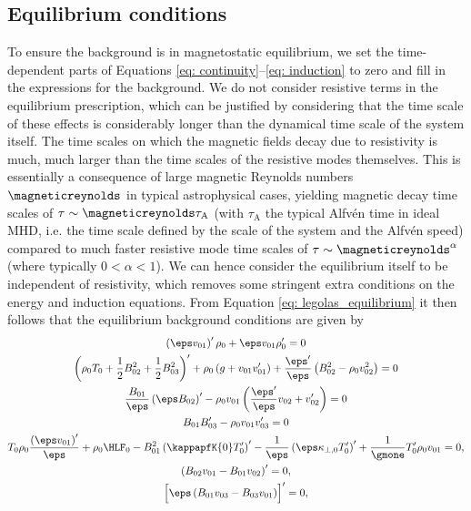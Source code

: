 \subsection{Equilibrium conditions} \label{ss: equilibrium conditions}
To ensure the background is in magnetostatic equilibrium, we set the time-dependent parts of Equations \eqref{eq: continuity}--\eqref{eq: induction} to zero and fill in the expressions for the background. We do not consider resistive terms in the equilibrium prescription, which can be justified by considering that the time scale of these effects is considerably longer than the dynamical time scale of the system itself. The time scales on which the magnetic fields decay due to resistivity is much, much larger than the time scales of the resistive modes themselves. This is essentially a consequence of large magnetic Reynolds numbers $\magneticreynolds$ in typical astrophysical cases, yielding magnetic decay time scales of $\tau \sim \magneticreynolds \tau_\text{A}$ (with $\tau_\text{A}$ the typical Alfv\'en time in ideal MHD, i.e. the time scale defined by the scale of the system and the Alfv\'en speed) compared to much faster resistive mode time scales of $\tau \sim \magneticreynolds^\alpha$ (where typically $0 < \alpha < 1$). We can hence consider the equilibrium itself to be independent of resistivity, which removes some stringent extra conditions on the energy and induction equations. From Equation \eqref{eq: legolas_equilibrium} it then follows that the equilibrium background conditions are given by
\begingroup
\allowdisplaybreaks
\begin{gather}
  \left(\eps v_{01}\right)'\rho_0 + \eps v_{01}\rho_0' = 0 \\
  \left(\rho_0 T_0 + \frac{1}{2}B_{02}^2 + \frac{1}{2}B_{03}^2\right)'
    + \rho_0\left(g + v_{01}v_{01}'\right)
    + \frac{\eps'}{\eps}\left(B_{02}^2
    - \rho_0 v_{02}^2\right) = 0 \\
  \frac{B_{01}}{\eps}\left(\eps B_{02}\right)' - \rho_0 v_{01}\left(\frac{\eps'}{\eps}v_{02} + v_{02}'\right) = 0 \\
  B_{01}B_{03}' - \rho_0 v_{01}v_{03}' = 0 \\
  T_0 \rho_0 \frac{\left(\eps v_{01}\right)'}{\eps}
    + \rho_0 \HLF_0
    - B_{01}^2\left(\kappapfK{0} T_0'\right)'
    - \frac{1}{\eps}\left(\eps \kappa_{\perp, 0} T_0'\right)'
    + \frac{1}{\gmone}T_0'\rho_0 v_{01} = 0, \label{eq: general_thermal_equilibrium} \\
  \left(B_{02}v_{01} - B_{01}v_{02}\right)' = 0, \\
  \Bigl[\eps \left(B_{01}v_{03} - B_{03}v_{01}\right)\Bigr]' = 0,
\end{gather}
